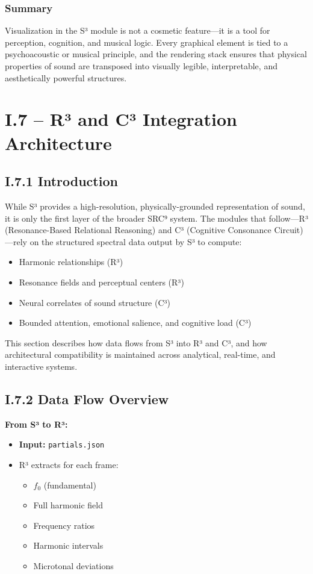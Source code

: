 \subsubsection*{Summary}

Visualization in the S³ module is not a cosmetic feature—it is a tool for perception, cognition, and musical logic. Every graphical element is tied to a psychoacoustic or musical principle, and the rendering stack ensures that physical properties of sound are transposed into visually legible, interpretable, and aesthetically powerful structures.

\section*{I.7 – R³ and C³ Integration Architecture}

\subsection*{I.7.1 Introduction}

While S³ provides a high-resolution, physically-grounded representation of sound, it is only the first layer of the broader SRC⁹ system. The modules that follow—R³ (Resonance-Based Relational Reasoning) and C³ (Cognitive Consonance Circuit)—rely on the structured spectral data output by S³ to compute:

\begin{itemize}
    \item Harmonic relationships (R³)
    \item Resonance fields and perceptual centers (R³)
    \item Neural correlates of sound structure (C³)
    \item Bounded attention, emotional salience, and cognitive load (C³)
\end{itemize}

This section describes how data flows from S³ into R³ and C³, and how architectural compatibility is maintained across analytical, real-time, and interactive systems.

\subsection*{I.7.2 Data Flow Overview}

\textbf{From S³ to R³:}

\begin{itemize}
    \item \textbf{Input:} \texttt{partials.json}
    \item R³ extracts for each frame:
    \begin{itemize}
        \item $f_0$ (fundamental)
        \item Full harmonic field
        \item Frequency ratios
        \item Harmonic intervals
        \item Microtonal deviations
    \end{itemize}
\end{itemize}

